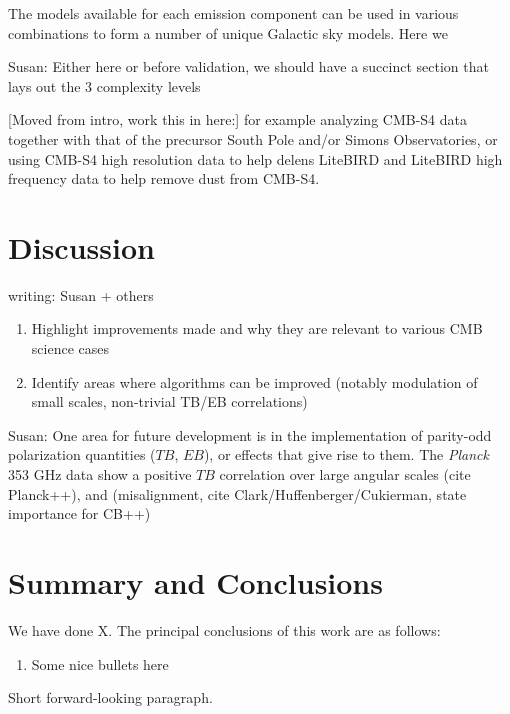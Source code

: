 \documentclass[twocolumn]{aastex631}
\begin{document}
The models available for each emission component can be used in various combinations to form a number of unique Galactic sky models. Here we 

Susan: Either here or before validation, we should have a succinct section that lays out the 3 complexity levels

[Moved from intro, work this in here:]
for example analyzing CMB-S4 data together with that of the precursor South Pole and/or Simons Observatories, or using CMB-S4 high resolution data to help delens LiteBIRD and LiteBIRD high frequency data to help remove dust from CMB-S4.


\section{Discussion} \label{sec:discussion}
writing: Susan + others

\begin{enumerate}
    \item Highlight improvements made and why they are relevant to various CMB science cases
    \item Identify areas where algorithms can be improved (notably modulation of small scales, non-trivial TB/EB correlations)
\end{enumerate}

Susan:
One area for future development is in the implementation of parity-odd polarization quantities ($TB$, $EB$), or effects that give rise to them. The \textit{Planck} 353 GHz data show a positive $TB$ correlation over large angular scales (cite Planck++), and (misalignment, cite Clark/Huffenberger/Cukierman, state importance for CB++)

\section{Summary and Conclusions} \label{sec:summary}

We have done X. The principal conclusions of this work are as follows:

\begin{enumerate}
    \item Some nice bullets here
\end{enumerate}

Short forward-looking paragraph.


\end{document}
